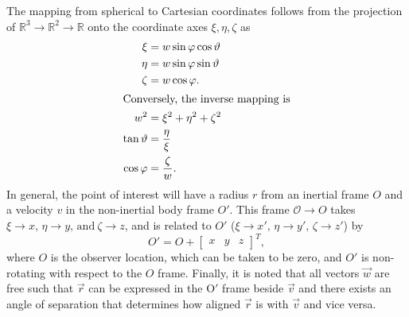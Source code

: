 \documentclass[11pt]{thesis}
\numberwithin{equation}{section}
\begin{document}
The mapping from spherical to Cartesian coordinates follows from the projection of $\mathbb{R}^3 \to \mathbb{R}^2 \to \mathbb{R}$ onto the coordinate axes $\xi, \eta, \zeta$ as
\begin{align}
\xi &= w \sin \varphi \cos \vartheta \label{eq:sph2carx} \\
\eta &= w \sin \varphi \sin \vartheta \label{eq:sph2cary} \\
\zeta &= w \cos \varphi. \label{eq:sph2carz} \\
\intertext{Conversely, the inverse mapping is}
w^2 &= \xi^2 + \eta^2 + \zeta^2\\
\tan \vartheta &= \frac{\eta}{\xi}\\
\cos \varphi &= \frac{\zeta}{w}.
\end{align}
In general, the point of interest will have a radius $r$ from an inertial frame $\mathit{O}$ and a velocity $v$ in the non-inertial body frame $\mathit{O}'$. This frame $\mathcal{O} \to \mathit{O}$ takes $\xi \to x, \, \eta \to y,\, \text{and}\  \zeta \to z$, and is related to $\mathit{O}'$ ($\xi \to x', \, \eta \to y', \, \zeta \to z'$) by
\begin{equation}
\mathit{O}' = \mathit{O} + \begin{bmatrix}x & y & z\end{bmatrix}^T,
\end{equation}
where $\mathit{O}$ is the observer location, which can be taken to be zero, and $\mathit{O'}$ is non-rotating with respect to the $\mathit{O}$ frame.
Finally, it is noted that all vectors $\vec{w}$ are free such that $\vec{r}$ can be expressed in the $\mathrm{O}'$ frame beside $\vec{v}$ and there exists an angle of separation that determines how aligned $\vec{r}$ is with $\vec{v}$ and vice versa.
\end{document}
